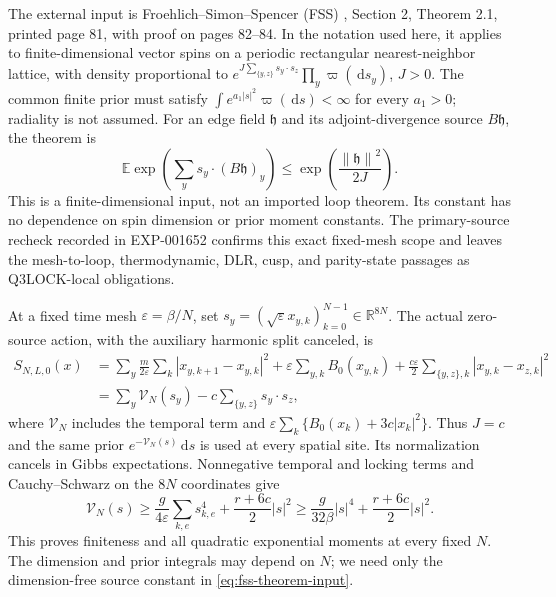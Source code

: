 \documentclass[11pt]{article}
\numberwithin{equation}{section}
\theoremstyle{definition}
\newcommand{\R}{\mathbb R}
\newcommand{\E}{\mathbb E}
\newcommand{\dd}{\,\mathrm d}
\newcommand{\norm}[1]{\left\lVert#1\right\rVert}
\newcommand{\eps}{\varepsilon}
\begin{document}
The external input is Froehlich--Simon--Spencer (FSS) \cite{FSS}, Section 2,
Theorem 2.1, printed page 81, with proof on pages 82--84.  In the notation
used here, it applies to finite-dimensional vector spins on a periodic
rectangular nearest-neighbor lattice, with density proportional to
$e^{J\sum_{\{y,z\}}s_y\cdot s_z}\prod_y\varpi(\dd s_y)$, $J>0$.
The common finite prior must satisfy
$\int e^{a_1|s|^2}\varpi(\dd s)<\infty$ for every $a_1>0$; radiality is
not assumed.  For an edge field $\mathfrak h$ and its adjoint-divergence
source $B\mathfrak h$, the theorem is
\begin{equation}
 \E\exp\left(\sum_y s_y\cdot(B\mathfrak h)_y\right)
 \leq\exp\left(\frac{\norm{\mathfrak h}^2}{2J}\right).
 \label{eq:fss-theorem-input}
\end{equation}
This is a finite-dimensional input, not an imported loop theorem.  Its
constant has no dependence on spin dimension or prior moment constants.
The primary-source recheck recorded in EXP-001652 confirms this exact
fixed-mesh scope and leaves the mesh-to-loop, thermodynamic, DLR, cusp,
and parity-state passages as Q3LOCK-local obligations.

At a fixed time mesh $\eps=\beta/N$, set
$s_y=(\sqrt\eps x_{y,k})_{k=0}^{N-1}\in\R^{8N}$.  The actual
zero-source action, with the auxiliary harmonic split canceled, is
\begin{align}
 S_{N,L,0}(x)&=\sum_y\frac m{2\eps}\sum_k|x_{y,k+1}-x_{y,k}|^2
       +\eps\sum_{y,k}B_0(x_{y,k})
       +\frac{c\eps}2\sum_{\{y,z\},k}|x_{y,k}-x_{z,k}|^2
 \nonumber\\
 &=\sum_y\mathcal V_N(s_y)-c\sum_{\{y,z\}}s_y\cdot s_z,
 \label{eq:fss-scaled-action}
\end{align}
where $\mathcal V_N$ includes the temporal term and
$\eps\sum_k\{B_0(x_k)+3c|x_k|^2\}$.  Thus $J=c$ and the same
prior $e^{-\mathcal V_N(s)}\dd s$ is used at every spatial site.  Its
normalization cancels in Gibbs expectations.  Nonnegative temporal and
locking terms and Cauchy--Schwarz on the $8N$ coordinates give
\begin{equation}
 \mathcal V_N(s)\geq\frac g{4\eps}\sum_{k,e}s_{k,e}^4
                    +\frac{r+6c}{2}|s|^2
 \geq\frac g{32\beta}|s|^4+\frac{r+6c}{2}|s|^2.
 \label{eq:fss-prior-coercivity}
\end{equation}
This proves finiteness and all quadratic exponential moments at every fixed
$N$.  The dimension and prior integrals may depend on $N$; we need only
the dimension-free source constant in \eqref{eq:fss-theorem-input}.
\end{document}
